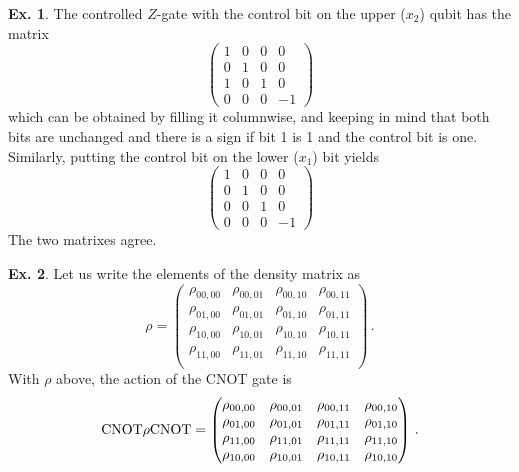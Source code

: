 \documentclass[a4paper,12pt]{article}
\theoremstyle{definition}
\newtheorem{exercise}{Ex.}[section]
\begin{document}
\begin{exercise}
 The controlled $Z$-gate with the control bit on the upper ($x_2$) qubit has the matrix
 \[
  \begin{pmatrix}
       1 & 0 & 0 &  0 \\
       0 & 1 & 0 &  0 \\
       1 & 0 & 1 &  0 \\
       0 & 0 & 0 & -1
  \end{pmatrix}
 \]
 which can be obtained by filling it columnwise, and keeping in mind that both bits are unchanged and there is a sign if bit 1 is 1 and the control bit is one. Similarly, putting the control bit on the lower ($x_1$) bit yields
 \[
  \begin{pmatrix}
        1 &  0 & 0 &  0 \\
        0 &  1 & 0 &  0 \\
        0 &  0 & 1 &  0 \\
        0 &  0 & 0 & -1
  \end{pmatrix}
 \]
 The two matrixes agree.
\end{exercise}

\begin{exercise}
 Let us write the elements of the density matrix as
 \[
  \rho =
  \begin{pmatrix}
   \rho_{00,00} & \rho_{00,01} & \rho_{00,10} & \rho_{00,11}\\
   \rho_{01,00} & \rho_{01,01} & \rho_{01,10} & \rho_{01,11}\\
   \rho_{10,00} & \rho_{10,01} & \rho_{10,10} & \rho_{10,11}\\
   \rho_{11,00} & \rho_{11,01} & \rho_{11,10} & \rho_{11,11}\\
  \end{pmatrix}\,.
 \]
 With $\rho$ above, the action of the CNOT gate is
 \[
  {\rm CNOT}\rho {\rm CNOT} =
  \begin{pmatrix}
   \rho_{00,00} & \rho_{00,01} & \rho_{00,11} & \rho_{00,10}\\
   \rho_{01,00} & \rho_{01,01} & \rho_{01,11} & \rho_{01,10}\\
   \rho_{11,00} & \rho_{11,01} & \rho_{11,11} & \rho_{11,10}\\
   \rho_{10,00} & \rho_{10,01} & \rho_{10,11} & \rho_{10,10}
  \end{pmatrix}\,.
 \]
\end{exercise}
\end{document}
